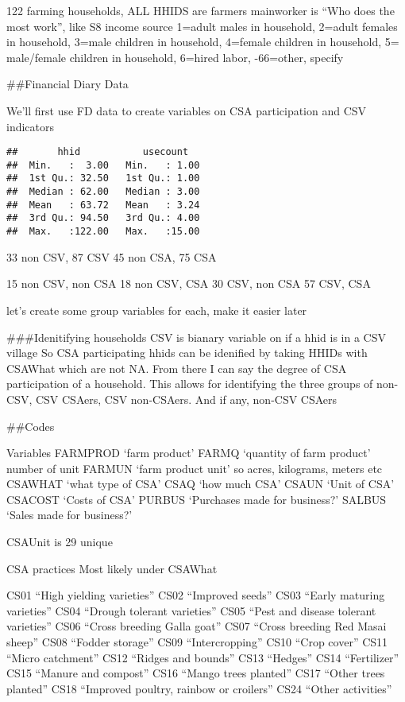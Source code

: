 \documentclass[
]{article}
\begin{document}
122 farming households, ALL HHIDS are farmers mainworker is ``Who does
the most work'', like S8 income source 1=adult males in household,
2=adult females in household, 3=male children in household, 4=female
children in household, 5= male/female children in household, 6=hired
labor, -66=other, specify

\#\#Financial Diary Data

We'll first use FD data to create variables on CSA participation and CSV
indicators

\begin{verbatim}
##       hhid           usecount    
##  Min.   :  3.00   Min.   : 1.00  
##  1st Qu.: 32.50   1st Qu.: 1.00  
##  Median : 62.00   Median : 3.00  
##  Mean   : 63.72   Mean   : 3.24  
##  3rd Qu.: 94.50   3rd Qu.: 4.00  
##  Max.   :122.00   Max.   :15.00
\end{verbatim}

33 non CSV, 87 CSV 45 non CSA, 75 CSA

15 non CSV, non CSA 18 non CSV, CSA 30 CSV, non CSA 57 CSV, CSA

let's create some group variables for each, make it easier later

\#\#\#Idenitifying households CSV is bianary variable on if a hhid is in
a CSV village So CSA participating hhids can be idenified by taking
HHIDs with CSAWhat which are not NA. From there I can say the degree of
CSA participation of a household. This allows for identifying the three
groups of non-CSV, CSV CSAers, CSV non-CSAers. And if any, non-CSV
CSAers

\#\#Codes

Variables FARMPROD `farm product' FARMQ `quantity of farm product'
number of unit FARMUN `farm product unit' so acres, kilograms, meters
etc CSAWHAT `what type of CSA' CSAQ `how much CSA' CSAUN `Unit of CSA'
CSACOST `Costs of CSA' PURBUS `Purchases made for business?' SALBUS
`Sales made for business?'

CSAUnit is 29 unique

CSA practices Most likely under CSAWhat

CS01 ``High yielding varieties'' CS02 ``Improved seeds'' CS03 ``Early
maturing varieties'' CS04 ``Drough tolerant varieties'' CS05 ``Pest and
disease tolerant varieties'' CS06 ``Cross breeding Galla goat'' CS07
``Cross breeding Red Masai sheep'' CS08 ``Fodder storage'' CS09
``Intercropping'' CS10 ``Crop cover'' CS11 ``Micro catchment'' CS12
``Ridges and bounds'' CS13 ``Hedges'' CS14 ``Fertilizer'' CS15 ``Manure
and compost'' CS16 ``Mango trees planted'' CS17 ``Other trees planted''
CS18 ``Improved poultry, rainbow or croilers'' CS24 ``Other activities''
\end{document}
